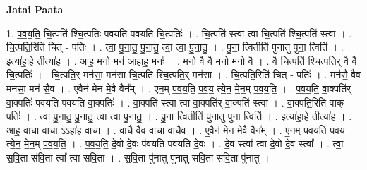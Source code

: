 \documentclass[17pt]{extarticle}
\begin{document}
\textbf{Jatai Paata} \newline

1. प॒व॒य॒ति॒ चि॒त्पति॑ श्चि॒त्पतिः॑ पवयति पवयति चि॒त्पतिः॑ । . चि॒त्पति॑ स्त्वा त्वा चि॒त्पति॑ श्चि॒त्पति॑ स्त्वा । . चि॒त्पति॒रिति॑ चित् - पतिः॑ । . त्वा॒ पु॒ना॒तु॒ पु॒ना॒तु॒ त्वा॒ त्वा॒ पु॒ना॒तु॒ । . पु॒ना॒ त्वितीति॑ पुनातु पुना॒ त्विति॑ । . इत्या॑हा॒हे तीत्या॑ह । . आ॒ह॒ मनो॒ मन॑ आहाह॒ मनः॑ । . मनो॒ वै वै मनो॒ मनो॒ वै । . वै चि॒त्पति॑ श्चि॒त्पति॒र् वै वै चि॒त्पतिः॑ । . चि॒त्पति॒र् मन॑सा॒ मन॑सा चि॒त्पति॑ श्चि॒त्पति॒र् मन॑सा । . चि॒त्पति॒रिति॑ चित् - पतिः॑ । . मन॑सै॒ वैव मन॑सा॒ मन॑ सै॒व । . ए॒वैन॑ मेन मे॒वै वैन᳚म् । . ए॒न॒म् प॒व॒य॒ति॒ प॒व॒य॒ त्ये॒न॒ मे॒न॒म् प॒व॒य॒ति॒ । . प॒व॒य॒ति॒ वा॒क्पति॑र् वा॒क्पतिः॑ पवयति पवयति वा॒क्पतिः॑ । . वा॒क्पति॑ स्त्वा त्वा वा॒क्पति॑र् वा॒क्पति॑ स्त्वा । . वा॒क्पति॒रिति॑ वाक् - पतिः॑ । . त्वा॒ पु॒ना॒तु॒ पु॒ना॒तु॒ त्वा॒ त्वा॒ पु॒ना॒तु॒ । . पु॒ना॒ त्वितीति॑ पुनातु पुना॒ त्विति॑ । . इत्या॑हा॒हे तीत्या॑ह । . आ॒ह॒ वा॒चा वा॒चा ऽऽहा॑ह वा॒चा । . वा॒चै वैव वा॒चा वा॒चैव । . ए॒वैन॑ मेन मे॒वै वैन᳚म् । . ए॒न॒म् प॒व॒य॒ति॒ प॒व॒य॒ त्ये॒न॒ मे॒न॒म् प॒व॒य॒ति॒ । . प॒व॒य॒ति॒ दे॒वो दे॒वः प॑वयति पवयति दे॒वः । . दे॒व स्त्वा᳚ त्वा दे॒वो दे॒व स्त्वा᳚ । . त्वा॒ स॒वि॒ता स॑वि॒ता त्वा᳚ त्वा सवि॒ता । . स॒वि॒ता पु॑नातु पुनातु सवि॒ता स॑वि॒ता पु॑नातु । \newline
\end{document}
